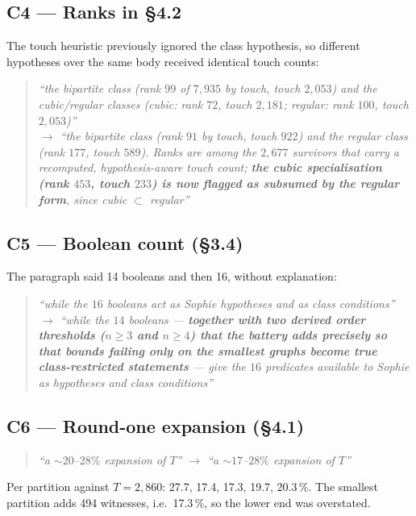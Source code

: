 \documentclass[11pt,a4paper]{article}
\newenvironment{chg}{%
  \begin{quote}\small\color{black!80}\itshape}{\end{quote}}
\begin{document}
\subsection{C4 --- Ranks in \S4.2}
The touch heuristic previously ignored the class hypothesis, so different
hypotheses over the same body received identical touch counts:
\begin{chg}
``the bipartite class (rank $99$ of $7{,}935$ by touch, touch $2{,}053$) and the
cubic/regular classes (cubic: rank $72$, touch $2{,}181$; regular: rank $100$,
touch $2{,}053$)''\\
$\rightarrow$ ``the bipartite class (rank $91$ by touch, touch $922$) and the
regular class (rank $177$, touch $589$). Ranks are among the $2{,}677$ survivors
that carry a recomputed, hypothesis-aware touch count; \textbf{the cubic
specialisation (rank $453$, touch $233$) is now flagged as subsumed by the
regular form}, since cubic $\subset$ regular''
\end{chg}

\subsection{C5 --- Boolean count (\S3.4)}
The paragraph said 14 booleans and then 16, without explanation:
\begin{chg}
``while the \textbf{$16$} booleans act as Sophie hypotheses and as class conditions''\\
$\rightarrow$ ``while the \textbf{$14$} booleans --- \textbf{together with two
derived order thresholds ($n \ge 3$ and $n \ge 4$) that the battery adds
precisely so that bounds failing only on the smallest graphs become true
class-restricted statements} --- give the $16$ predicates available to Sophie as
hypotheses and class conditions''
\end{chg}

\subsection{C6 --- Round-one expansion (\S4.1)}
\begin{chg}
``a $\sim\!20$--$28\%$ expansion of $T$'' $\rightarrow$ ``a $\sim\!17$--$28\%$ expansion of $T$''
\end{chg}
Per partition against $T = 2{,}860$: 27.7, 17.4, 17.3, 19.7, 20.3\,\%. The
smallest partition adds 494 witnesses, i.e.\ 17.3\,\%, so the lower end was
overstated.
\end{document}
